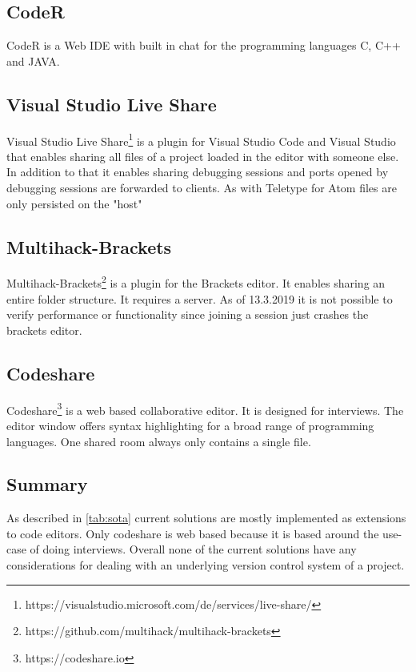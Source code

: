 \subsection{CodeR}
CodeR\cite{KurniawanSoesantoWijaya:2015:CodeR:Real-timeCodeEditorApplicationforCollaborativeProgramming} is a Web IDE with built in chat for the programming languages C, C++ and JAVA. 
\subsection{Visual Studio Live Share}
Visual Studio Live Share\footnote{https://visualstudio.microsoft.com/de/services/live-share/}  is a plugin for Visual Studio Code and Visual Studio that enables sharing all files of a project loaded in the editor with someone else. In addition to that it enables sharing debugging sessions and ports opened by debugging sessions are forwarded to clients. As with Teletype for Atom files are only persisted on the "host"  
\subsection{Multihack-Brackets}
Multihack-Brackets\footnote{https://github.com/multihack/multihack-brackets} is a plugin for the Brackets editor. It enables sharing an entire folder structure. It requires a server. As of 13.3.2019 it is not possible to verify performance or functionality since joining a session just crashes the brackets editor. 
\subsection{Codeshare}
Codeshare\footnote{https://codeshare.io} is a web based collaborative editor. It is designed for interviews. The editor window offers syntax highlighting for a broad range of programming languages. One shared room always only contains a single file. 
\subsection{Summary}
As described in \ref{tab:sota} current solutions are mostly implemented as extensions to code editors. Only codeshare is web based because it is based around the use-case of doing interviews. Overall none of the current solutions have any considerations for dealing with an underlying version control system of a project.

